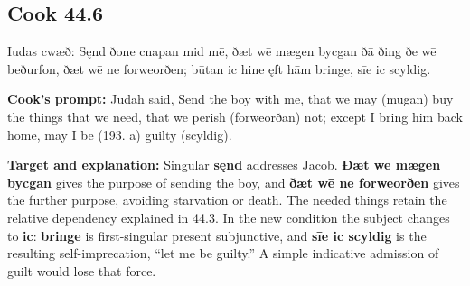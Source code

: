 \par\begin{minipage}{\linewidth}\raggedright
\subsection*{Cook 44.6}

Iudas cwæð: Sęnd ðone cnapan mid mē, ðæt wē mægen bycgan ðā ðing ðe wē beðurfon, ðæt wē ne forweorðen; būtan ic hine ęft hām bringe, sīe ic scyldig.

\textbf{Cook’s prompt:} Judah said, Send the boy with me, that we may (mugan) buy the things that we need, that we perish (forweorðan) not; except I bring him back home, may I be (193. a) guilty (scyldig).

\textbf{Target and explanation:} Singular \textbf{sęnd} addresses Jacob. \textbf{Ðæt wē mægen bycgan} gives the purpose of sending the boy, and \textbf{ðæt wē ne forweorðen} gives the further purpose, avoiding starvation or death. The needed things retain the relative dependency explained in 44.3. In the new condition the subject changes to \textbf{ic}: \textbf{bringe} is first-singular present subjunctive, and \textbf{sīe ic scyldig} is the resulting self-imprecation, “let me be guilty.” A simple indicative admission of guilt would lose that force.

\end{minipage}\par\addvspace{4pt}


